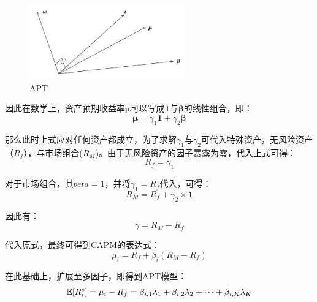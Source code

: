 \documentclass[11pt]{article}
\begin{document}
\begin{appendices}
\begin{figure}[H]
    \centering
    \includegraphics[width=0.6\textwidth]{fig/apt.jpg}
    \caption{APT}
    \label{fig:apt}
\end{figure}

因此在数学上，资产预期收益率$\bm{\mu}$可以写成$\bm{1}$与$\bm{\beta}$的线性组合，即：
\begin{equation*}
    \bm{\mu} = \gamma_1 \bm{1} + \gamma_2 \bm{\beta}
\end{equation*}

那么此时上式应对任何资产都成立，为了求解$\gamma_1$与$\gamma_2$可代入特殊资产，无风险资产（$R_f$），与市场组合($R_M$)。由于无风险资产的因子暴露为零，代入上式可得：
\begin{equation*}
    R_f = \gamma_1
\end{equation*}

对于市场组合，其$beta=1$，并将$\gamma_1 = R_f$代入，可得：
\begin{equation*}
    R_M = R_f + \gamma_2 \times \bm{1}
\end{equation*}

因此有：
\begin{equation*}
    \gamma = R_M - R_f
\end{equation*}

代入原式，最终可得到CAPM的表达式：
\begin{equation*}
    \mu_i = R_f + \beta_i(R_M - R_f)
\end{equation*}

在此基础上，扩展至多因子，即得到APT模型：
\begin{equation*}
    \mathbb{E}[R_{i}^{e}] = \mu_i - R_f = \beta_{i,1} \lambda_1 + \beta_{i,2} \lambda_2 + \dots + \beta_{i,K} \lambda_K
\end{equation*}

\end{appendices}
\end{document}
